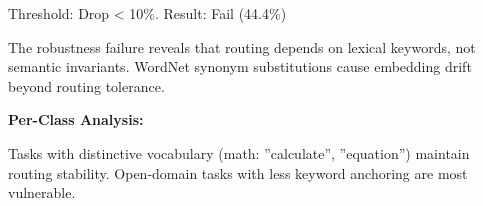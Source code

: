 Threshold: Drop < 10\%. Result: Fail (44.4\%)

The robustness failure reveals that routing depends on lexical keywords, not semantic invariants. WordNet synonym substitutions cause embedding drift beyond routing tolerance.

\textbf{Per-Class Analysis:}

\begin{table}[htbp]
\centering
{}
\end{table}

Tasks with distinctive vocabulary (math: ''calculate'', ''equation'') maintain routing stability. Open-domain tasks with less keyword anchoring are most vulnerable.
